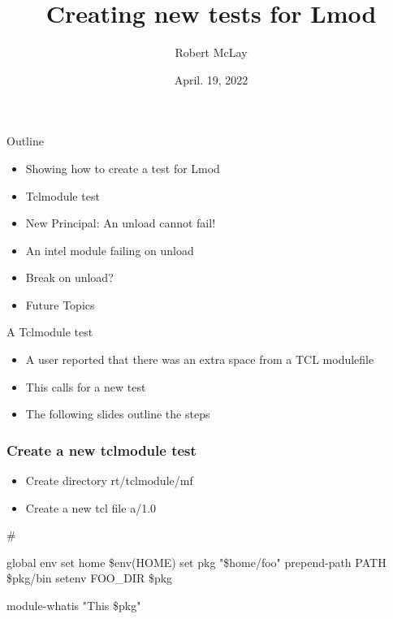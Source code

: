 \documentclass{beamer}
\begin{document}
\title[Lmod]{Creating new tests for Lmod}
\author{Robert McLay} 
\date{April. 19, 2022}

\frame{\titlepage} 


\begin{frame}{Outline}
  \begin{itemize}
    \item Showing how to create a test for Lmod
    \item Tclmodule test
    \item New Principal: An unload cannot fail!
    \item An intel module failing on unload
    \item Break on unload?
    \item Future Topics
  \end{itemize}
\end{frame}

\begin{frame}{A Tclmodule test}
  \begin{itemize}
    \item A user reported that there was an extra space from a TCL
      modulefile
    \item This calls for a new test
    \item The following slides outline the steps
  \end{itemize}
\end{frame}

\begin{frame}[fragile]
    \frametitle{Create a new tclmodule test}
  \begin{itemize}
    \item Create directory rt/tclmodule/mf
    \item Create a new tcl file a/1.0
  \end{itemize}

 {\small
    \begin{semiverbatim}
#%

global env
set home \$env(HOME)
set pkg "\$home/foo"
prepend-path PATH \$pkg/bin
setenv FOO\_DIR \$pkg

module-whatis "This \$pkg"
    \end{semiverbatim}
}
\end{frame}
\end{document}
